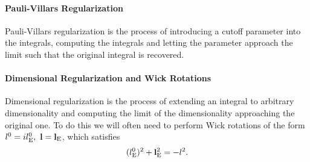 \paragraph{Pauli-Villars Regularization}
Pauli-Villars regularization is the process of introducing a cutoff parameter into the integrals, computing the integrals and letting the parameter approach the limit such that the original integral is recovered.

\paragraph{Dimensional Regularization and Wick Rotations}
Dimensional regularization is the process of extending an integral to arbitrary dimensionality and computing the limit of the dimensionality approaching the original one. To do this we will often need to perform Wick rotations of the form $l^{0} = il_{\text{E}}^{0},\ \vb{l} = \vb{l}_{\text{E}}$, which satisfies
\begin{align*}
	(l_{\text{E}}^{0})^{2} + \vb{l}_{\text{E}}^{2} = -l^{2}.
\end{align*}